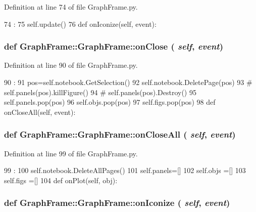 Definition at line 74 of file GraphFrame.py.


\begin{DoxyCode}
74                              :
75         self.update()
76 
    def onIconize(self, event):
\end{DoxyCode}
\hypertarget{classGraphFrame_1_1GraphFrame_afc4c4359e1dd987ef93e49c132774401}{
\subsubsection[{onClose}]{\setlength{\rightskip}{0pt plus 5cm}def GraphFrame::GraphFrame::onClose ( {\em self}, \/   {\em event})}}
\label{classGraphFrame_1_1GraphFrame_afc4c4359e1dd987ef93e49c132774401}


Definition at line 90 of file GraphFrame.py.


\begin{DoxyCode}
90                             :
91         pos=self.notebook.GetSelection()
92         self.notebook.DeletePage(pos)
93 #        self.panels(pos).killFigure()
94 #        self.panels(pos).Destroy()
95         self.panels.pop(pos)
96         self.objs.pop(pos)
97         self.figs.pop(pos)
98 
    def onCloseAll(self, event):
\end{DoxyCode}
\hypertarget{classGraphFrame_1_1GraphFrame_a8a73c880fceb4359e4f78289f4132c0e}{
\subsubsection[{onCloseAll}]{\setlength{\rightskip}{0pt plus 5cm}def GraphFrame::GraphFrame::onCloseAll ( {\em self}, \/   {\em event})}}
\label{classGraphFrame_1_1GraphFrame_a8a73c880fceb4359e4f78289f4132c0e}


Definition at line 99 of file GraphFrame.py.


\begin{DoxyCode}
99                                :
100         self.notebook.DeleteAllPages()
101         self.panels=[]
102         self.objs  =[]
103         self.figs  =[]
104         
    def onPlot(self, obj):
\end{DoxyCode}
\hypertarget{classGraphFrame_1_1GraphFrame_a6d46010ff05f8030489df77bd77230f6}{
\subsubsection[{onIconize}]{\setlength{\rightskip}{0pt plus 5cm}def GraphFrame::GraphFrame::onIconize ( {\em self}, \/   {\em event})}}
\label{classGraphFrame_1_1GraphFrame_a6d46010ff05f8030489df77bd77230f6}


